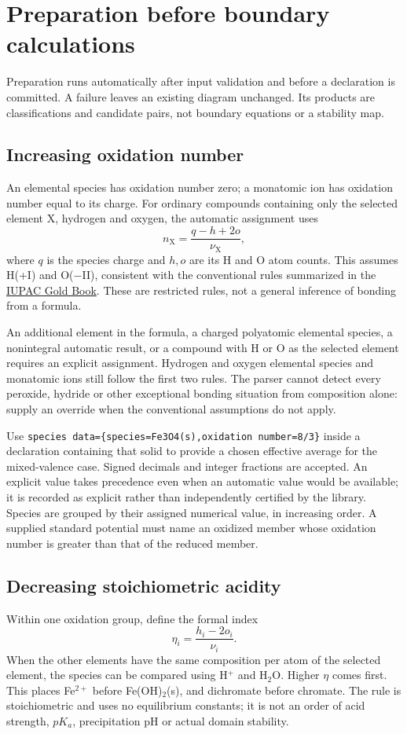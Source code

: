 \documentclass[a4paper,11pt]{ltxdoc}
\begin{document}
\section{Preparation before boundary calculations}
Preparation runs automatically after input validation and before a declaration
is committed. A failure leaves an existing diagram unchanged. Its products are
classifications and candidate pairs, not boundary equations or a stability map.

\subsection{Increasing oxidation number}
An elemental species has oxidation number zero; a monatomic ion has oxidation
number equal to its charge. For ordinary compounds containing only the selected
element X, hydrogen and oxygen, the automatic assignment uses
\[
  n_{\mathrm X}=\frac{q-h+2o}{\nu_{\mathrm X}},
\]
where $q$ is the species charge and $h,o$ are its H and O atom counts. This assumes
H(+I) and O($-$II), consistent with the conventional rules summarized in the
\href{https://old.goldbook.iupac.org/html/O/O04365_old.html}{IUPAC Gold Book}.
These are restricted rules, not a general inference of bonding from a formula.

An additional element in the formula, a charged polyatomic elemental species,
a nonintegral automatic result, or a compound with H or O as the selected
element requires an explicit assignment. Hydrogen and oxygen elemental species
and monatomic ions still follow the first two rules. The parser cannot detect
every peroxide, hydride or other exceptional bonding situation from composition
alone: supply an override when the conventional assumptions do not apply.

Use \texttt{species data=\{species=Fe3O4(s),oxidation number=8/3\}} inside a
declaration containing that solid to provide a chosen effective average for the
mixed-valence case. Signed decimals and integer fractions are accepted. An
explicit value takes precedence even when an automatic value would be available;
it is recorded as explicit rather than independently certified by the library.
Species are grouped by their assigned numerical value, in increasing order.
A supplied standard potential must name an oxidized member whose oxidation
number is greater than that of the reduced member.

\subsection{Decreasing stoichiometric acidity}
Within one oxidation group, define the formal index
\[
  \eta_i=\frac{h_i-2o_i}{\nu_i}.
\]
When the other elements have the same composition per atom of the selected
element, the species can be compared using H$^+$ and H$_2$O. Higher $\eta$ comes
first. This places Fe$^{2+}$ before Fe(OH)$_2$(s), and dichromate before chromate.
The rule is stoichiometric and uses no equilibrium constants; it is not an order
of acid strength, $pK_a$, precipitation pH or actual domain stability.
\end{document}
